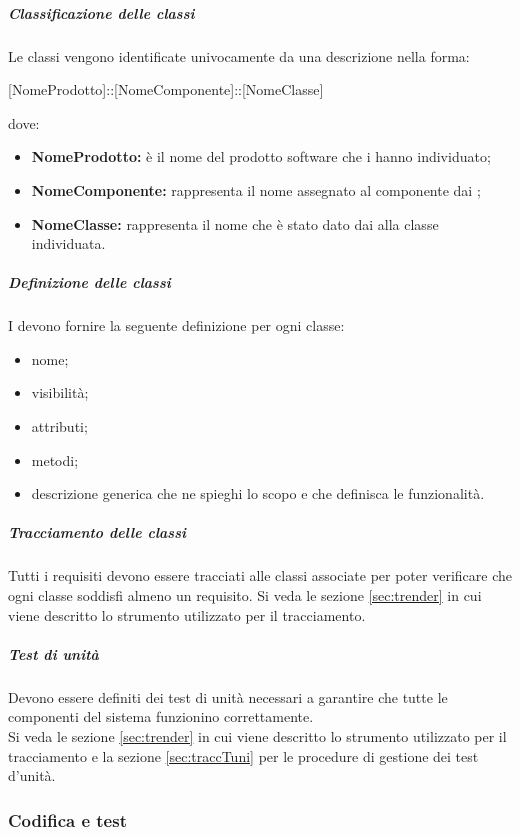 	            \subparagraph{Classificazione delle classi}
	             Le classi vengono identificate univocamente da una descrizione nella forma:
	            \begin{center}
					[NomeProdotto]::[NomeComponente]::[NomeClasse]
	            \end{center}
	            dove:
	            \begin{itemize}
	            	\item \textbf{NomeProdotto:} è il nome del prodotto software che i \progettisti{} hanno individuato;
	            	\item \textbf{NomeComponente:} rappresenta il nome assegnato al componente dai \progettisti;
	            	\item \textbf{NomeClasse:} rappresenta il nome che è stato dato dai \progettisti{} alla classe individuata.
	            \end{itemize}
	            
                \subparagraph{Definizione delle classi}
                I \progettisti{} devono fornire la seguente definizione per ogni classe:
                \begin{itemize}
                	\item nome;
                	\item visibilità;
                	\item attributi;
                	\item metodi;
                	\item descrizione generica che ne spieghi lo scopo e che definisca le funzionalità.
                \end{itemize}
                \subparagraph{Tracciamento delle classi}
                Tutti i requisiti devono essere tracciati alle classi associate per poter verificare che ogni classe soddisfi almeno un requisito. Si veda le sezione \ref{sec:trender} in cui viene descritto lo strumento utilizzato per il tracciamento.
                \subparagraph{Test di unità}\label{sec:testUnit}
                Devono essere definiti dei test di unità necessari a garantire che tutte le componenti del sistema funzionino correttamente. \\
                Si veda le sezione \ref{sec:trender} in cui viene descritto lo strumento utilizzato per il tracciamento e la sezione \ref{sec:traccTuni} per le procedure di gestione dei test d'unità.
                
            \subsubsection{Codifica e test}
